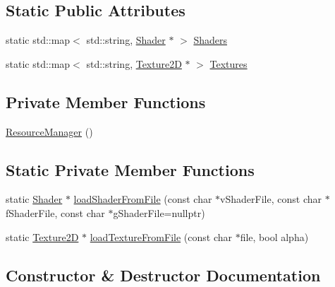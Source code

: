\subsection*{Static Public Attributes}
\begin{DoxyCompactItemize}
\item 
static std\+::map$<$ std\+::string, \hyperlink{classShader}{Shader} $\ast$ $>$ \hyperlink{classResourceManager_a162a5f89e9ec47ed31692bb1ce76290a}{Shaders}
\item 
static std\+::map$<$ std\+::string, \hyperlink{classTexture2D}{Texture2D} $\ast$ $>$ \hyperlink{classResourceManager_a0a62bc298e457b4b55d185503aa35937}{Textures}
\end{DoxyCompactItemize}
\subsection*{Private Member Functions}
\begin{DoxyCompactItemize}
\item 
\hyperlink{classResourceManager_a3b32babd2e81909bbd90d7f2d566fadb}{Resource\+Manager} ()
\end{DoxyCompactItemize}
\subsection*{Static Private Member Functions}
\begin{DoxyCompactItemize}
\item 
static \hyperlink{classShader}{Shader} $\ast$ \hyperlink{classResourceManager_aeceee147638d827ca8b88a3dba259cb8}{load\+Shader\+From\+File} (const char $\ast$v\+Shader\+File, const char $\ast$f\+Shader\+File, const char $\ast$g\+Shader\+File=nullptr)
\item 
static \hyperlink{classTexture2D}{Texture2D} $\ast$ \hyperlink{classResourceManager_a6fe65aa4de1374cd7f007e564d1c1971}{load\+Texture\+From\+File} (const char $\ast$file, bool alpha)
\end{DoxyCompactItemize}


\subsection{Constructor \& Destructor Documentation}
\mbox{\label{classResourceManager_a3b32babd2e81909bbd90d7f2d566fadb}} 
